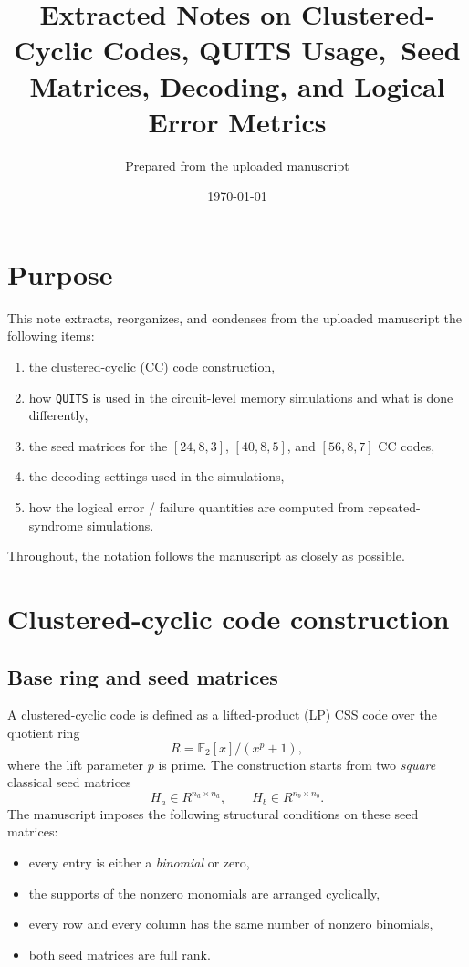 \documentclass[11pt]{article}
\title{Extracted Notes on Clustered-Cyclic Codes, QUITS Usage,\
Seed Matrices, Decoding, and Logical Error Metrics}
\author{Prepared from the uploaded manuscript}
\date{\today}
\begin{document}
\maketitle

\section{Purpose}
This note extracts, reorganizes, and condenses from the uploaded manuscript the following items:
\begin{enumerate}[label=(\arabic*)]
    \item the clustered-cyclic (CC) code construction,
    \item how \texttt{QUITS} is used in the circuit-level memory simulations and what is done differently,
    \item the seed matrices for the $[24,8,3]$, $[40,8,5]$, and $[56,8,7]$ CC codes,
    \item the decoding settings used in the simulations,
    \item how the logical error / failure quantities are computed from repeated-syndrome simulations.
\end{enumerate}
Throughout, the notation follows the manuscript as closely as possible.

\section{Clustered-cyclic code construction}

\subsection{Base ring and seed matrices}
A clustered-cyclic code is defined as a lifted-product (LP) CSS code over the quotient ring
\[
R = \mathbb{F}_2[x]/(x^p+1),
\]
where the lift parameter $p$ is prime. The construction starts from two \emph{square} classical seed matrices
\[
H_a \in R^{n_a\times n_a}, \qquad H_b \in R^{n_b\times n_b}.
\]
The manuscript imposes the following structural conditions on these seed matrices:
\begin{itemize}
    \item every entry is either a \emph{binomial} or zero,
    \item the supports of the nonzero monomials are arranged cyclically,
    \item every row and every column has the same number of nonzero binomials,
    \item both seed matrices are full rank.
\end{itemize}
\end{document}
